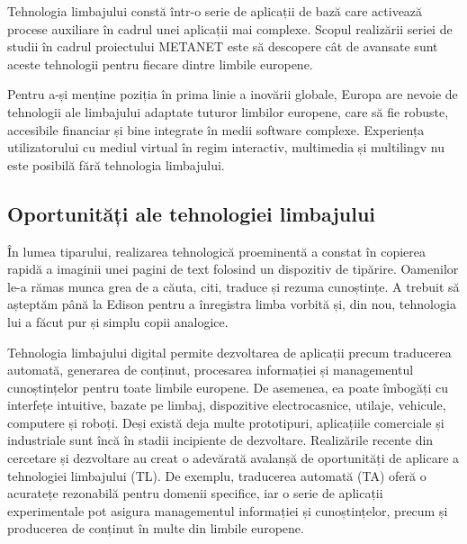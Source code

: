 \begin{multicols}{2}
Tehnologia limbajului constă \mbox{într-o} serie de aplicații de bază care activează procese auxiliare în cadrul unei aplicații mai complexe. Scopul realizării seriei de studii în cadrul proiectului METANET este să descopere cât de avansate sunt aceste tehnologii pentru fiecare dintre limbile europene. 


Pentru a-și menține poziția în prima linie a inovării globale, Europa are nevoie de tehnologii ale limbajului adaptate tuturor limbilor europene, care să fie robuste, accesibile financiar și bine integrate în medii software complexe. Experiența utilizatorului cu mediul virtual în regim interactiv, multimedia și multilingv nu este posibilă fără tehnologia limbajului.

\subsection{Oportunități ale tehnologiei limbajului}

În lumea tiparului, realizarea tehnologică proeminentă a constat în copierea rapidă a imaginii unei pagini de text folosind un dispozitiv de tipărire. Oamenilor le-a rămas munca grea de a căuta, citi, traduce și rezuma cunoștințe. A trebuit să așteptăm până la Edison pentru a înregistra limba vorbită și, din nou, tehnologia lui a făcut pur și simplu copii analogice.

Tehnologia limbajului digital permite dezvoltarea de aplicații precum traducerea automată, generarea de conținut, procesarea informației și managementul cunoștințelor pentru toate limbile europene. De asemenea, ea poate îmbogăți cu interfețe intuitive, bazate pe limbaj, dispozitive electrocasnice, utilaje, vehicule, computere și roboți. Deși există deja multe prototipuri, aplicațiile comerciale și industriale sunt încă în stadii incipiente de dezvoltare. Realizările recente din cercetare și dezvoltare au creat o adevărată avalanșă de oportunități de aplicare a tehnologiei limbajului (TL). De exemplu, traducerea automată (TA) oferă o acuratețe rezonabilă pentru domenii specifice, iar o serie de aplicații experimentale pot asigura managementul informației și cunoștințelor, precum și producerea de conținut în multe din limbile europene. 


\end{multicols}
